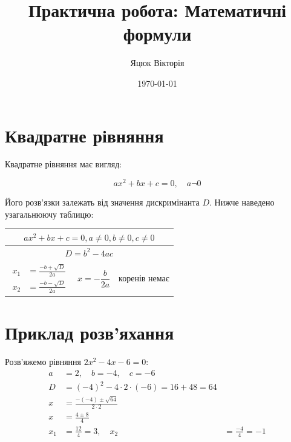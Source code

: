 \documentclass[12pt]{article} %
\title{Практична робота: Математичні формули}
\author{Яцюк Вікторія}
\date{\today}
\begin{document}
\maketitle %
 \section* {Квадратне рівняння}  

Квадратне рівняння має вигляд:

\begin{equation}
ax^2 + bx + c = 0, \quad a \neg 0
\end{equation}

Його розв'язки залежать від значення дискримінанта $D$. Нижче наведено узагальнюючу таблицю:

\begin{table}[h]
\centering
\renewcommand{\arraystretch}{3}
\begin{tabular}{|c|c|c|}
\hline
\multicolumn{3}{|c|}{$ax^2 + bx + c = 0, a \neq 0, b \neq 0, c \neq 0$}\\ \hline
\multicolumn{3}{|c|}{$D = b^2 - 4ac$}\\ \hline
$\begin{aligned}
    x_1 &= \frac{-b + \sqrt{D}}{2a} \\
    x_2 &= \frac{-b - \sqrt{D}}{2a}
\end{aligned}$ &
$x = -\dfrac{b}{2a}$ &
коренів немає \\ \hline
\end{tabular}
\end{table}
\section*{Приклад розв'яхання}
Розв'яжемо рівняння $2x^2 - 4x - 6 = 0$:
\begin{align*}
a &= 2, \quad b = -4, \quad c = -6\\
D &= (-4)^2 - 4 \cdot 2 \cdot (-6) = 16 + 48 = 64\\
x &= \frac{-(-4)\pm \sqrt{64}}{2 \cdot 2} \\
x &=\frac{4 \pm 8}{4} \\
x_1 &= \frac{12}{4} = 3, \quad x_2 &= \frac{-4}{4} = -1
\end{align*}
\end{document}
